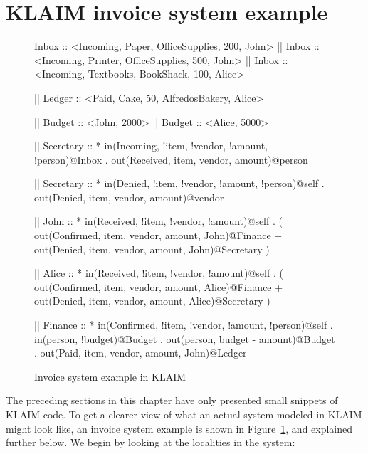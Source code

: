 \section{KLAIM invoice system example}
\begin{figure}
\begin{klaim}  
   Inbox :: <Incoming, Paper, OfficeSupplies, 200, John>
|| Inbox :: <Incoming, Printer, OfficeSupplies, 500, John>  
|| Inbox :: <Incoming, Textbooks, BookShack, 100, Alice>  

|| Ledger :: <Paid, Cake, 50, AlfredosBakery, Alice>

|| Budget :: <John, 2000>
|| Budget :: <Alice, 5000>
  
|| Secretary :: * in(Incoming, !item, !vendor, !amount,  
                     !person)@Inbox 
                . out(Received, item, vendor, amount)@person

|| Secretary :: * in(Denied, !item, !vendor, !amount, !person)@self 
                . out(Denied, item, vendor, amount)@vendor

|| John :: * in(Received, !item, !vendor, !amount)@self
           . 
           (
           out(Confirmed, item, vendor, amount, John)@Finance
           +
           out(Denied, item, vendor, amount, John)@Secretary
           )

|| Alice :: * in(Received, !item, !vendor, !amount)@self
           . 
           (
           out(Confirmed, item, vendor, amount, Alice)@Finance
           +
           out(Denied, item, vendor, amount, Alice)@Secretary
           )

|| Finance :: * in(Confirmed, !item, !vendor, !amount, !person)@self
              . in(person, !budget)@Budget 
              . out(person, budget - amount)@Budget
              . out(Paid, item, vendor, amount, John)@Ledger
	\end{klaim}           
	\caption{Invoice system example in KLAIM}\label{fig:invoice_system}
  \end{figure}

	The preceding sections in this chapter have only presented small snippets of 
	KLAIM code. To get a clearer view of what an actual system modeled in KLAIM 
	might look like, an invoice system example is shown in 
	Figure~\ref{fig:invoice_system}, and explained further below.
	We begin by looking at the localities in the system:
	
